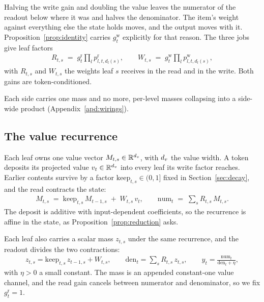 Halving the write gain and doubling the value leaves the numerator of the readout below where it was and halves the denominator. The item's weight against everything else the state holds moves, and the output moves with it. Proposition~\ref{prop:identity} carries $g^{\mathrm{w}}_t$ explicitly for that reason. The three jobs give leaf factors
\begin{align}
  R_{t,s} \;=\; g^{\mathrm{r}}_t \prod_{l} p^{\mathrm{r}}_{l,t,d_l(s)},
  \qquad
  W_{t,s} \;=\; g^{\mathrm{w}}_t \prod_{l} p^{\mathrm{w}}_{l,t,d_l(s)} ,
  \label{eq:leaffactors}
\end{align}
with $R_{t,s}$ and $W_{t,s}$ the weights leaf $s$ receives in the read and in the write. Both gains are token-conditioned.

Each side carries one mass and no more, per-level masses collapsing into a side-wide product (Appendix~\ref{apd:wirings}).

\subsection{The value recurrence}
\label{sec:recurrence}

Each leaf owns one value vector $M_{t,s} \in \mathbb{R}^{d_v}$, with $d_v$ the value width. A token deposits its projected value $v_t \in \mathbb{R}^{d_v}$ into every leaf its write factor reaches. Earlier contents survive by a factor $\mathrm{keep}_{t,s} \in (0,1]$ fixed in Section~\ref{sec:decay}, and the read contracts the state:
\begin{align}
  M_{t,s} \;=\; \mathrm{keep}_{t,s}\, M_{t-1,s} \;+\; W_{t,s}\, v_t ,
  \qquad
  \mathrm{num}_t \;=\; \textstyle\sum_{s} R_{t,s}\, M_{t,s} .
  \label{eq:recurrence}
\end{align}
The deposit is additive with input-dependent coefficients, so the recurrence is affine in the state, as Proposition~\ref{prop:reduction} asks.

Each leaf also carries a scalar mass $z_{t,s}$ under the same recurrence, and the readout divides the two contractions:
\begin{align}
  z_{t,s} = \mathrm{keep}_{t,s}\, z_{t-1,s} + W_{t,s},
  \qquad
  \mathrm{den}_t = \textstyle\sum_s R_{t,s}\, z_{t,s},
  \qquad
  y_t = \frac{\mathrm{num}_t}{\mathrm{den}_t + \eta} ,
  \label{eq:global}
\end{align}
with $\eta > 0$ a small constant. The mass is an appended constant-one value channel, and the read gain cancels between numerator and denominator, so we fix $g^{\mathrm{r}}_t = 1$.


